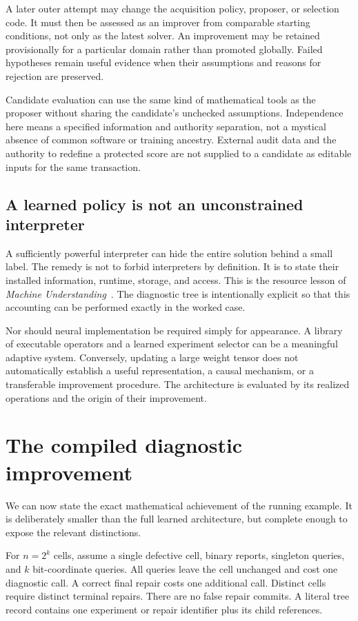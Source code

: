 \documentclass[11pt,letterpaper]{article}
\theoremstyle{plain}
\theoremstyle{definition}
\begin{document}
A later outer attempt may change the acquisition policy, proposer, or selection code. It must then be assessed as an improver from comparable starting conditions, not only as the latest solver. An improvement may be retained provisionally for a particular domain rather than promoted globally. Failed hypotheses remain useful evidence when their assumptions and reasons for rejection are preserved.

Candidate evaluation can use the same kind of mathematical tools as the proposer without sharing the candidate's unchecked assumptions. Independence here means a specified information and authority separation, not a mystical absence of common software or training ancestry. External audit data and the authority to redefine a protected score are not supplied to a candidate as editable inputs for the same transaction.

\subsection{A learned policy is not an unconstrained interpreter}
A sufficiently powerful interpreter can hide the entire solution behind a small label. The remedy is not to forbid interpreters by definition. It is to state their installed information, runtime, storage, and access. This is the resource lesson of \emph{Machine Understanding}~\cite{understanding}. The diagnostic tree is intentionally explicit so that this accounting can be performed exactly in the worked case.

Nor should neural implementation be required simply for appearance. A library of executable operators and a learned experiment selector can be a meaningful adaptive system. Conversely, updating a large weight tensor does not automatically establish a useful representation, a causal mechanism, or a transferable improvement procedure. The architecture is evaluated by its realized operations and the origin of their improvement.

\section{The compiled diagnostic improvement}\label{sec:worked}
We can now state the exact mathematical achievement of the running example. It is deliberately smaller than the full learned architecture, but complete enough to expose the relevant distinctions.

For $n=2^k$ cells, assume a single defective cell, binary reports, singleton queries, and $k$ bit-coordinate queries. All queries leave the cell unchanged and cost one diagnostic call. A correct final repair costs one additional call. Distinct cells require distinct terminal repairs. There are no false repair commits. A literal tree record contains one experiment or repair identifier plus its child references.
\end{document}
